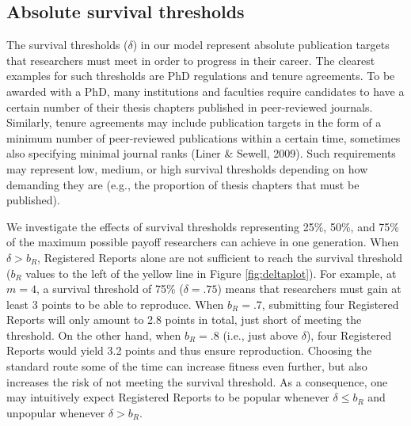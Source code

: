 \documentclass[
  ,man,mask,floatsintext]{apa6}
\begin{document}
\hypertarget{absolute-survival-thresholds}{%
\subsection{Absolute survival thresholds}\label{absolute-survival-thresholds}}

The survival thresholds (\(\delta\)) in our model represent absolute publication targets that researchers must meet in order to progress in their career.
The clearest examples for such thresholds are PhD regulations and tenure agreements.
To be awarded with a PhD, many institutions and faculties require candidates to have a certain number of their thesis chapters published in peer-reviewed journals.
Similarly, tenure agreements may include publication targets in the form of a minimum number of peer-reviewed publications within a certain time, sometimes also specifying minimal journal ranks (Liner \& Sewell, 2009).
Such requirements may represent low, medium, or high survival thresholds depending on how demanding they are (e.g., the proportion of thesis chapters that must be published).

We investigate the effects of survival thresholds representing 25\%, 50\%, and 75\% of the maximum possible payoff researchers can achieve in one generation.
When \(\delta > b_{R}\), Registered Reports alone are not sufficient to reach the survival threshold (\(b_{R}\) values to the left of the yellow line in Figure \ref{fig:deltaplot}).
For example, at \(m = 4\), a survival threshold of 75\% (\(\delta = .75\)) means that researchers must gain at least 3 points to be able to reproduce.
When \(b_{R} = .7\), submitting four Registered Reports will only amount to 2.8 points in total, just short of meeting the threshold.
On the other hand, when \(b_{R} = .8\) (i.e., just above \(\delta\)), four Registered Reports would yield 3.2 points and thus ensure reproduction.
Choosing the standard route some of the time can increase fitness even further, but also increases the risk of not meeting the survival threshold.
As a consequence, one may intuitively expect Registered Reports to be popular whenever \(\delta \leq b_{R}\) and unpopular whenever \(\delta > b_{R}\).
\end{document}
